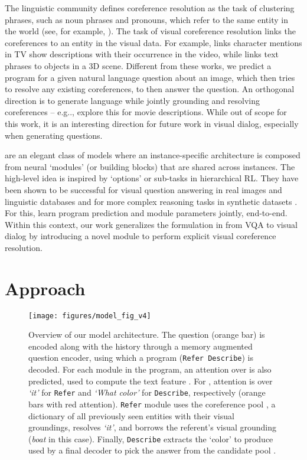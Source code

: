 \documentclass[runningheads]{llncs}
\makeatletter
\DeclareRobustCommand\onedot{\futurelet\@let@token\@onedot}
\def\@onedot{\ifx\@let@token.\else.\null\fi\xspace}
\def\eg{e.g\onedot} \def\Eg{E.g\onedot}
\newcommand{\myparagraph}[1]{\vspace{0pt}\noindent{\bf #1}}
\makeatother
\begin{document}
\myparagraph{Coreference resolution.}
The linguistic community defines coreference resolution as the task of
clustering phrases, such as noun phrases and pronouns, which refer to the same entity in the world (see, for example, \cite{bergsma06acl}). 
The task of visual coreference resolution  links the coreferences to an entity in 
the visual data.
For example, \cite{ramanathan14eccv} links character mentions in TV show 
descriptions with their occurrence in the video,
while \cite{kong14cvpr} links text phrases to objects in a 3D 
scene.
Different from these works, we predict a program for a given natural 
language question about an image, which then tries to resolve any existing 
coreferences, to then answer the question. 
An orthogonal direction is to generate language while jointly grounding and 
resolving coreferences -- \eg, \cite{rohrbach17cvpr} explore this for movie 
descriptions.
While out of scope for this work, it is an interesting direction for future 
work in visual dialog, especially when generating questions.


\myparagraph{Neural Module Networks} \cite{andreas16cvpr}
are an elegant class of models where an instance-specific architecture is 
composed from neural `modules' (or building blocks) that are shared across instances.
The high-level idea is inspired by `options' or sub-tasks in hierarchical RL. 
They have been shown to be successful for visual question answering in real 
images and linguistic databases \cite{andreas_naacl16} and for more complex 
reasoning tasks in synthetic datasets \cite{johnson17iccv,hu2017learning}.
For this, \cite{johnson17iccv,hu2017learning} learn program prediction and 
module parameters jointly, end-to-end.
Within this context, our work generalizes the formulation in 
\cite{hu2017learning} from VQA to visual dialog by introducing a novel module to perform explicit visual coreference resolution. 
\section{Approach}
\label{sec:approach}

\begin{figure}[t]
	\centering
    \texttt{[image: figures/model\_fig\_v4]}
    \caption{
    Overview of our model architecture.
    The question  (orange bar) is encoded along with the history  
    through a memory augmented question encoder, using which a program 	
    (\texttt{Refer Describe}) is decoded.
    For each module in the program, an attention  over  is 
    also predicted, used to compute the text feature .
	For , attention is over \textit{`it'} for \texttt{Refer} and 
    \textit{`What color'} for \texttt{Describe}, respectively
  	(orange bars with red attention).
    \texttt{Refer} module uses the coreference pool , a dictionary of
    all previously seen entities with their visual groundings,
    resolves \textit{`it'}, and borrows the referent's visual grounding 	
    (\textit{boat} in this case).
    Finally, \texttt{Describe} extracts the `color' to produce  used by a 
    final decoder to pick the answer  from the candidate pool 
    .
    }
\label{fig:model_fig}
\end{figure}
\end{document}
